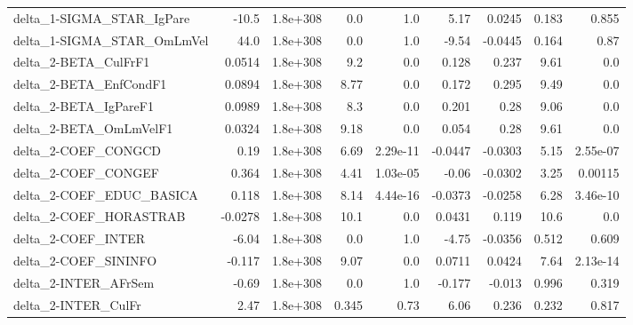 \begin{tabular}{lrrrrrrrr}
delta\_1-SIGMA\_STAR\_IgPare             &       -10.5 &     1.8e+308 &      0.0 &      1.0 &       5.17 &      0.0245 &        0.183 &         0.855 \\
delta\_1-SIGMA\_STAR\_OmLmVel            &        44.0 &     1.8e+308 &      0.0 &      1.0 &      -9.54 &     -0.0445 &        0.164 &          0.87 \\
delta\_2-BETA\_CulFrF1                  &      0.0514 &     1.8e+308 &      9.2 &      0.0 &      0.128 &       0.237 &         9.61 &           0.0 \\
delta\_2-BETA\_EnfCondF1                &      0.0894 &     1.8e+308 &     8.77 &      0.0 &      0.172 &       0.295 &         9.49 &           0.0 \\
delta\_2-BETA\_IgPareF1                 &      0.0989 &     1.8e+308 &      8.3 &      0.0 &      0.201 &        0.28 &         9.06 &           0.0 \\
delta\_2-BETA\_OmLmVelF1                &      0.0324 &     1.8e+308 &     9.18 &      0.0 &      0.054 &        0.28 &         9.61 &           0.0 \\
delta\_2-COEF\_CONGCD                   &        0.19 &     1.8e+308 &     6.69 & 2.29e-11 &    -0.0447 &     -0.0303 &         5.15 &      2.55e-07 \\
delta\_2-COEF\_CONGEF                   &       0.364 &     1.8e+308 &     4.41 & 1.03e-05 &      -0.06 &     -0.0302 &         3.25 &       0.00115 \\
delta\_2-COEF\_EDUC\_BASICA              &       0.118 &     1.8e+308 &     8.14 & 4.44e-16 &    -0.0373 &     -0.0258 &         6.28 &      3.46e-10 \\
delta\_2-COEF\_HORASTRAB                &     -0.0278 &     1.8e+308 &     10.1 &      0.0 &     0.0431 &       0.119 &         10.6 &           0.0 \\
delta\_2-COEF\_INTER                    &       -6.04 &     1.8e+308 &      0.0 &      1.0 &      -4.75 &     -0.0356 &        0.512 &         0.609 \\
delta\_2-COEF\_SININFO                  &      -0.117 &     1.8e+308 &     9.07 &      0.0 &     0.0711 &      0.0424 &         7.64 &      2.13e-14 \\
delta\_2-INTER\_AFrSem                  &       -0.69 &     1.8e+308 &      0.0 &      1.0 &     -0.177 &      -0.013 &        0.996 &         0.319 \\
delta\_2-INTER\_CulFr                   &        2.47 &     1.8e+308 &    0.345 &     0.73 &       6.06 &       0.236 &        0.232 &         0.817 \\

\end{tabular}
